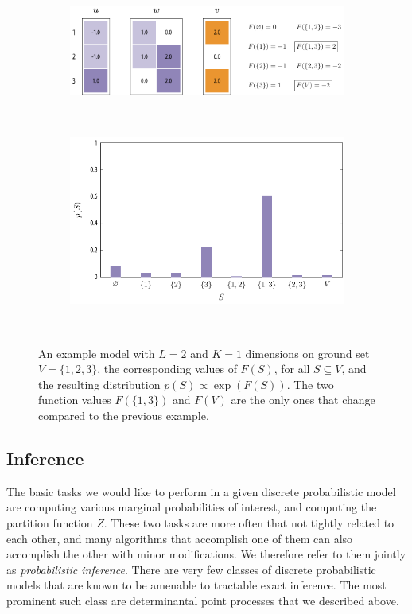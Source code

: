\begin{example}[\fldc{}]
\renewcommand{\subflen}{\textwidth}
\begin{figure}[htbp]
  \centering
  \begin{subfigure}[b]{\subflen}
    \centering
    \includegraphics[width=\textwidth]{figures/background/fldc.pdf}
  \end{subfigure}\\[1.5em]
  \begin{subfigure}[b]{\subflen}
    \centering
    \hspace{-2.65em}\includegraphics[width=1.07\textwidth]{figures/background/fldc_dist.pdf}
  \end{subfigure}\\[1em]
  \caption{An example \fldc{} model with $L = 2$ and $K = 1$ dimensions on ground set $V = \{1, 2, 3\}$, the corresponding values of $F(S)$, for all $S \subseteq V$, and the resulting distribution $p(S) \propto \exp(F(S))$.
  The two function values $F(\{1, 3\})$ and $F(V)$ are the only ones that change compared to the previous \flid{} example.
  }
  \label{fig:fldc}
\end{figure}
\end{example}


\subsection{Inference}
The basic tasks we would like to perform in a given discrete probabilistic model are computing various marginal probabilities of interest, and computing the partition function $Z$.
These two tasks are more often that not tightly related to each other, and many algorithms that accomplish one of them can also accomplish the other with minor modifications.
We therefore refer to them jointly as \emph{probabilistic inference}.
There are very few classes of discrete probabilistic models that are known to be amenable to tractable exact inference.
The most prominent such class are determinantal point processes that we described above.

